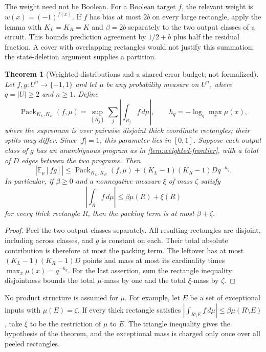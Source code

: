 \documentclass[11pt]{article}
\theoremstyle{plain}
\newtheorem{theorem}{Theorem}[section]
\theoremstyle{definition}
\theoremstyle{remark}
\begin{document}
The weight need not be Boolean. For a Boolean target $f$, the relevant weight is
$w(x)=(-1)^{f(x)}$. If $f$ has bias at most $2b$ on every large rectangle, apply the lemma
with $K_L=K_R=K$ and $\beta=2b$ separately to the two output classes of a circuit. This bounds prediction
agreement by $1/2+b$ plus half the residual fraction. A cover with overlapping rectangles
would not justify this summation; the state-deletion argument supplies a partition.

\begin{theorem}[Weighted distributions and a shared error budget; not formalized]
\label{thm:weighted-distribution}
Let $f,g:U^n\to\{-1,1\}$ and let $\mu$ be any probability measure on $U^n$, where
$q=|U|\ge2$ and $n\ge1$. Define
\[
  \operatorname{Pack}_{K_L,K_R}(f,\mu)
  =\sup_{(R_j)}\sum_j\left|\int_{R_j}f\,d\mu\right|,
  \qquad h_q=-\log_q\max_x\mu(x),
\]
where the supremum is over pairwise disjoint thick coordinate rectangles; their splits
may differ. Since $|f|=1$, this parameter lies in $[0,1]$.
Suppose each output class of $g$ has an unambiguous program as in
\cref{lem:weighted-frontier}, with a total of $D$ edges between the two programs. Then
\[
  |\mathbb E_\mu[fg]|
  \le\operatorname{Pack}_{K_L,K_R}(f,\mu)+(K_L-1)(K_R-1)Dq^{-h_q}.
\]
In particular, if $\beta\ge0$ and a nonnegative measure $\xi$ of mass $\zeta$ satisfy
\[
  \left|\int_R f\,d\mu\right|\le\beta\mu(R)+\xi(R)
\]
for every thick rectangle $R$, then the packing term is at most $\beta+\zeta$.
\end{theorem}

\begin{proof}
Peel the two output classes separately. All resulting rectangles are disjoint, including
across classes, and $g$ is constant on each. Their total absolute contribution is therefore
at most the packing term. The leftover has at most $(K_L-1)(K_R-1)D$ points and mass at most
its cardinality times $\max_x\mu(x)=q^{-h_q}$. For the last assertion, sum the rectangle
inequality: disjointness bounds the total $\mu$-mass by one and the total $\xi$-mass by
$\zeta$.
\end{proof}

No product structure is assumed for $\mu$. For example, let $E$ be a set of exceptional
inputs with $\mu(E)=\zeta$. If every thick rectangle satisfies
$|\int_{R\setminus E}f\,d\mu|\le\beta\mu(R\setminus E)$, take $\xi$ to be the restriction
of $\mu$ to $E$. The triangle inequality gives the hypothesis of the theorem, and the
exceptional mass is charged only once over all peeled rectangles.
\end{document}
